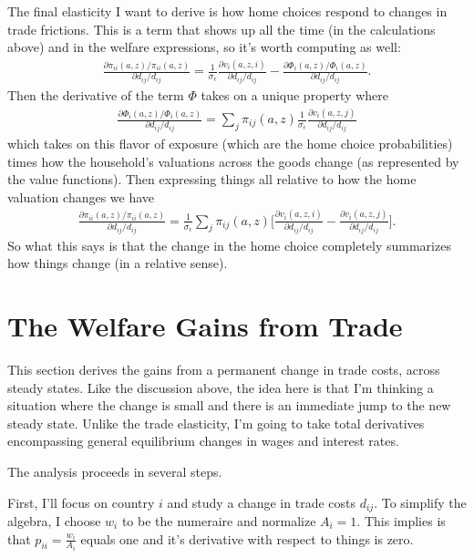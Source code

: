 \documentclass[12pt,pdftex]{article}
\begin{document}
\begin{onehalfspacing}
The final elasticity I want to derive is how home choices respond to changes in trade frictions. This is a term that shows up all the time (in the calculations above) and in the welfare expressions, so it's worth computing as well:
\begin{align}
\frac{\partial \pi_{ii}(a,z) / \pi_{ii}(a,z) }{\partial d_{ij} / d_{ij}} = \frac{1}{\sigma_{\epsilon}}\frac{\partial v_{i}(a,z,i)}{\partial d_{ij}/d_{ij}} - \frac{\partial \Phi_{i}(a,z) / \Phi_{i}(a,z)}{\partial d_{ij}/d_{ij}}.
\end{align}
Then the derivative of the term $\Phi$ takes on a unique property where
\begin{align}
\frac{\partial \Phi_{i}(a,z) / \Phi_{i}(a,z)}{\partial d_{ij}/d_{ij}} = \sum_{j} \pi_{ij}(a,z) \frac{1}{\sigma_{\epsilon}}\frac{\partial v_{i}(a,z,j)}{\partial d_{ij}/d_{ij}}
\end{align}
which takes on this flavor of exposure (which are the home choice probabilities) times how the household's valuations across the goods change (as represented by the value functions). Then expressing things all relative to how the home valuation changes we have
\begin{align}
\frac{\partial \pi_{ii}(a,z) / \pi_{ii}(a,z) }{\partial d_{ij} / d_{ij}} = \frac{1}{\sigma_{\epsilon}} \sum_{j} \pi_{ij}(a,z) \bigg[ \frac{\partial v_{i}(a,z,i)}{\partial d_{ij}/d_{ij}} - \frac{\partial v_{i}(a,z,j)}{\partial d_{ij}/d_{ij}} \bigg].
\label{eq:apx-change-home-choice}
\end{align}
So what this says is that the change in the home choice completely summarizes how things change (in a relative sense).

\section{The Welfare Gains from Trade}\label{apx-sec:gains-trade}

This section derives the gains from a permanent change in trade costs, across steady states. Like the discussion above, the idea here is that I'm thinking a situation where the change is small and there is an immediate jump to the new steady state. Unlike the trade elasticity, I'm going to take total derivatives encompassing general equilibrium changes in wages and interest rates.

The analysis proceeds in several steps.

First, I'll focus on country $i$ and study a change in trade costs $d_{ij}$. To simplify the algebra, I choose $w_i$ to be the numeraire and normalize $A_i = 1$. This implies is that $p_{ii} = \frac{w_i}{A_i}$ equals one and it's derivative with respect to things is zero.


\end{onehalfspacing}
\end{document}
